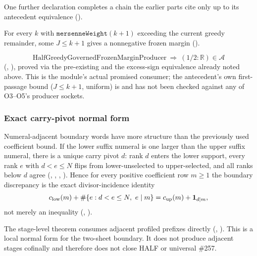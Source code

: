 One further declaration completes a chain the earlier parts cite only up to its antecedent
equivalence ().

\begin{defn}
For every $k$ with $\mathtt{mersenneWeight}(k+1)$ exceeding the current greedy remainder, some
$J\le k+1$ gives a nonnegative frozen margin
().
\end{defn}
\[
\mathrm{HalfGreedyGovernedFrozenMarginProducer}\ \Longrightarrow\ (1/2:\mathbb{R})\in\mathcal{A}
\]
(,
), proved via the pre-existing
 and the
excess-sign equivalence already noted above. This is the module's actual promised consumer; the
antecedent's own first-passage bound ($J\le k+1$, uniform) is  and has not been checked
against any of O3--O5's producer sockets.

\subsubsection{Exact carry-pivot normal form}

Numeral-adjacent boundary words have more structure than the previously used
coefficient bound.  If the lower suffix numeral is one larger than the upper
suffix numeral, there is a unique carry pivot $d$: rank $d$ enters the lower
support, every rank $e$ with $d<e\le N$ flips from lower-unselected to
upper-selected, and all ranks below $d$ agree
(,
, , ).  Hence for
every positive coefficient row $m\ge1$ the boundary discrepancy is the exact divisor-incidence
identity
\[
 c_{\rm low}(m)+\#\{e:d<e\le N,\ e\mid m\}
 =c_{\rm up}(m)+\mathbf 1_{d\mid m},
\]
not merely an inequality
(,
).

The stage-level theorem consumes adjacent profiled prefixes directly
(,
).  This is a local normal form for the two-sheet boundary.  It does
not produce adjacent stages cofinally and therefore does not close HALF or
universal \#257.

